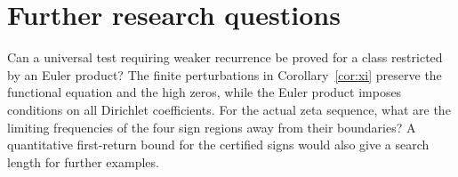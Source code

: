 \documentclass[11pt,letterpaper]{article}
\begin{document}
\section{Further research questions}
Can a universal test requiring weaker recurrence be proved for a class restricted by an Euler product? The finite perturbations in Corollary~\ref{cor:xi} preserve the functional equation and the high zeros, while the Euler product imposes conditions on all Dirichlet coefficients. For the actual zeta sequence, what are the limiting frequencies of the four sign regions away from their boundaries? A quantitative first-return bound for the certified signs would also give a search length for further examples.

\end{document}
